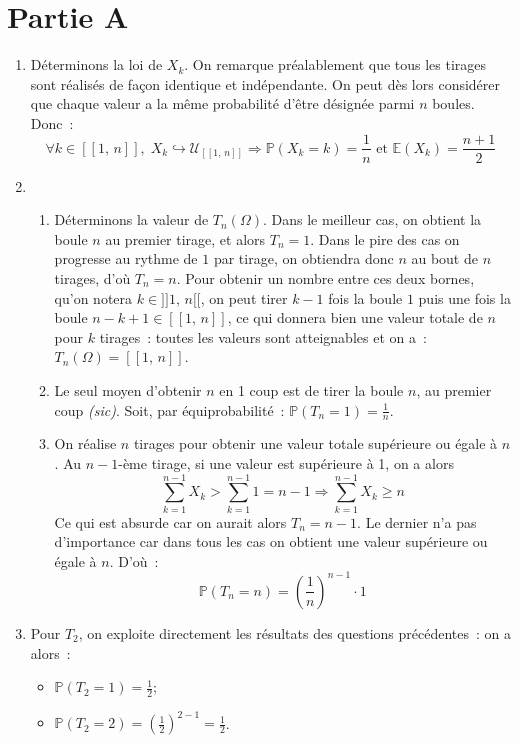 \documentclass{article}
\newcommand{\prob}{\mathbb{P}}
\newcommand{\esp}{\mathbb{E}}
\begin{document}
  \section*{Partie A}
  \begin{enumerate}
    \item Déterminons la loi de $X_k$. On remarque préalablement que tous les tirages sont réalisés de façon identique et indépendante. On peut dès lors considérer que chaque valeur a la même probabilité d'être désignée parmi $n$ boules. Donc~:
    \[
      \forall k \in [\![1,\, n]\!],\; X_k \hookrightarrow \mathcal{U}_{[\![1,\, n]\!]} \Longrightarrow \prob(X_k = k) = \frac{1}{n} \text{ et } \esp(X_k) = \frac{n + 1}{2}
    \]

    \item \begin{enumerate}
      \item \label{Q2} Déterminons la valeur de $T_n(\Omega)$. Dans le meilleur cas, on obtient la boule $n$ au premier tirage, et alors $T_n = 1$. Dans le pire des cas on progresse au rythme de $1$ par tirage, on obtiendra donc $n$ au bout de $n$ tirages, d'où $T_n = n$. Pour obtenir un nombre entre ces deux bornes, qu'on notera $k \in ]\!]1,\, n[\![$, on peut tirer $k - 1$ fois la boule $1$ puis une fois la boule $n - k + 1 \in [\![1,\, n]\!]$, ce qui donnera bien une valeur totale de $n$ pour $k$ tirages~: toutes les valeurs sont atteignables et on a~: $T_n(\Omega) = [\![1,\, n]\!]$.

      \item Le seul moyen d'obtenir $n$ en 1 coup est de tirer la boule $n$, au premier coup \textit{(sic)}. Soit, par équiprobabilité~: $\prob(T_n = 1) = \frac{1}{n}$.

      \item On réalise $n$ tirages pour obtenir une valeur totale supérieure ou égale à $n$. Au $n-1$-ème tirage, si une valeur est supérieure à 1, on a alors
      \[
        \sum_{k=1}^{n-1} X_k > \sum_{k=1}^{n-1} 1 = n - 1 \Longrightarrow \sum_{k=1}^{n-1} X_k \geqslant n
      \]
      Ce qui est absurde car on aurait alors $T_n = n - 1$. Le dernier n'a pas d'importance car dans tous les cas on obtient une valeur supérieure ou égale à $n$. D'où~:
      \[
        \prob(T_n = n) = \left(\frac{1}{n}\right)^{n-1} \cdot 1
      \]
    \end{enumerate}
    \item Pour $T_2$, on exploite directement les résultats des questions précédentes~: on a alors~:
    \begin{itemize}
      \item $\prob(T_2 = 1) = \frac{1}{2}$;
      \item $\prob(T_2 = 2) = \left(\frac{1}{2}\right)^{2 - 1} = \frac{1}{2}$.
    \end{itemize}


\end{enumerate}
\end{document}

